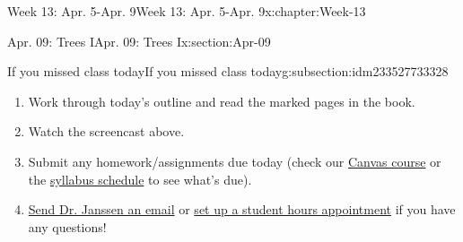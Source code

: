 \documentclass[oneside,10pt,]{book}
\numberwithin{equation}{section}
\begin{document}
\begin{chapterptx}{Week 13: Apr. 5-Apr. 9}{}{Week 13: Apr. 5-Apr. 9}{}{}{x:chapter:Week-13}
\begin{sectionptx}{Apr. 09: Trees I}{}{Apr. 09: Trees I}{}{}{x:section:Apr-09}
\begin{subsectionptx}{If you missed class today}{}{If you missed class today}{}{}{g:subsection:idm233527733328}
%
\begin{enumerate}
\item{}Work through today's outline and read the marked pages in the book.%
\item{}Watch the screencast above.%
\item{}Submit any homework\slash{}assignments due today (check our \href{https://dordt.instructure.com/courses/3110050}{Canvas course} or the \href{https://prof.mkjanssen.org/ds/index.html\#schedule}{syllabus schedule} to see what's due).%
\item{}\href{mailto:mike.janssen@dordt.edu}{Send Dr. Janssen an email} or \href{https://calendly.com/mkjanssen/student-hours}{set up a student hours appointment} if you have any questions!%
\end{enumerate}
\end{subsectionptx}
\end{sectionptx}
\end{chapterptx}
%
%
\typeout{************************************************}
\typeout{************************************************}
%
\end{document}
